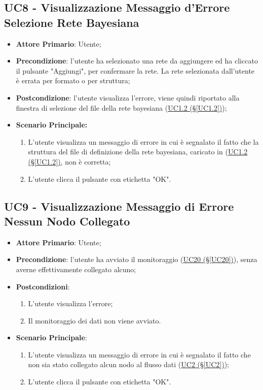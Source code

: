 \subsection{UC8 - Visualizzazione Messaggio d'Errore Selezione Rete Bayesiana}\label{UC8}
\begin{itemize}
\item \textbf{Attore Primario}: Utente;
\item \textbf{Precondizione}: l'utente ha selezionato una rete da aggiungere ed ha cliccato il pulsante "Aggiungi", per confermare la rete. La rete selezionata dall'utente è errata per formato o per struttura;
\item \textbf{Postcondizione}: l'utente visualizza l'errore, viene quindi riportato alla finestra di selezione del file della rete bayesiana (\hyperref[UC1.2]{UC1.2 (§\ref*{UC1.2})});
\item \textbf{Scenario Principale:}
	\begin{enumerate}
	\item L'utente visualizza un messaggio di errore in cui è segnalato il fatto che la struttura del file di definizione della rete bayesiana, caricato in (\hyperref[UC1.2]{UC1.2 (§\ref*{UC1.2})}, non è corretta;
	\item L'utente clicca il pulsante con etichetta "OK".
	\end{enumerate}
\end{itemize}

\pagebreak

\subsection{UC9 - Visualizzazione Messaggio di Errore Nessun Nodo Collegato}\label{UC9}
\begin{itemize}
\item \textbf{Attore Primario}: Utente;
\item \textbf{Precondizione}: l'utente ha avviato il monitoraggio (\hyperref[UC20]{UC20 (§\ref*{UC20})}), senza averne effettivamente collegato alcuno;
\item \textbf{Postcondizioni}:
	\begin{enumerate}
	\item L'utente visualizza l'errore;
	\item Il monitoraggio dei dati non viene avviato.
	\end{enumerate}
\item \textbf{Scenario Principale}:
	\begin{enumerate}
	\item L'utente visualizza un messaggio di errore in cui è segnalato il fatto che non sia stato collegato alcun 				nodo al flusso dati (\hyperref[UC2]{UC2 (§\ref*{UC2})});
	\item L'utente clicca il pulsante con etichetta "OK".
	\end{enumerate}
\end{itemize}

